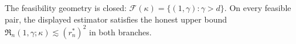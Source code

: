 The feasibility geometry is closed: \(\mathcal F(\kappa)=\{(1,\gamma):\gamma>d\}\). On every feasible pair, the displayed estimator satisfies the honest upper bound \(\mathfrak R_n(1,\gamma;\kappa)\lesssim(r_n^*)^2\) in both branches.